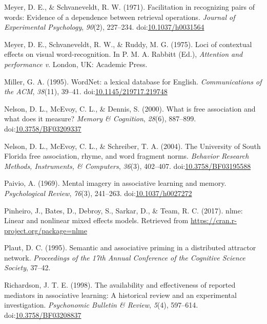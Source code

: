 \documentclass[english,man]{apa6}
\theoremstyle{definition}
\theoremstyle{definition}
\theoremstyle{definition}
\theoremstyle{remark}
\begin{document}
\hypertarget{ref-Meyer1971}{}
Meyer, D. E., \& Schvaneveldt, R. W. (1971). Facilitation in recognizing
pairs of words: Evidence of a dependence between retrieval operations.
\emph{Journal of Experimental Psychology}, \emph{90}(2), 227--234.
doi:\href{https://doi.org/10.1037/h0031564}{10.1037/h0031564}

\hypertarget{ref-Meyer1975}{}
Meyer, D. E., Schvaneveldt, R. W., \& Ruddy, M. G. (1975). Loci of
contextual effects on visual word-recognition. In P. M. A. Rabbitt
(Ed.), \emph{Attention and performance v}. London, UK: Academic Press.

\hypertarget{ref-Miller1995}{}
Miller, G. A. (1995). WordNet: a lexical database for English.
\emph{Communications of the ACM}, \emph{38}(11), 39--41.
doi:\href{https://doi.org/10.1145/219717.219748}{10.1145/219717.219748}

\hypertarget{ref-Nelson2000}{}
Nelson, D. L., McEvoy, C. L., \& Dennis, S. (2000). What is free
association and what does it measure? \emph{Memory \& Cognition},
\emph{28}(6), 887--899.
doi:\href{https://doi.org/10.3758/BF03209337}{10.3758/BF03209337}

\hypertarget{ref-Nelson2004}{}
Nelson, D. L., McEvoy, C. L., \& Schreiber, T. A. (2004). The University
of South Florida free association, rhyme, and word fragment norms.
\emph{Behavior Research Methods, Instruments, \& Computers},
\emph{36}(3), 402--407.
doi:\href{https://doi.org/10.3758/BF03195588}{10.3758/BF03195588}

\hypertarget{ref-Paivio1969}{}
Paivio, A. (1969). Mental imagery in associative learning and memory.
\emph{Psychological Review}, \emph{76}(3), 241--263.
doi:\href{https://doi.org/10.1037/h0027272}{10.1037/h0027272}

\hypertarget{ref-Pinheiro2017}{}
Pinheiro, J., Bates, D., Debroy, S., Sarkar, D., \& Team, R. C. (2017).
nlme: Linear and nonlinear mixed effects models. Retrieved from
\url{https://cran.r-project.org/package=nlme}

\hypertarget{ref-Plaut1995}{}
Plaut, D. C. (1995). Semantic and associative priming in a distributed
attractor network. \emph{Proceedings of the 17th Annual Conference of
the Cognitive Science Society}, 37--42.

\hypertarget{ref-Richardson1998}{}
Richardson, J. T. E. (1998). The availability and effectiveness of
reported mediators in associative learning: A historical review and an
experimental investigation. \emph{Psychonomic Bulletin \& Review},
\emph{5}(4), 597--614.
doi:\href{https://doi.org/10.3758/BF03208837}{10.3758/BF03208837}
\end{document}

